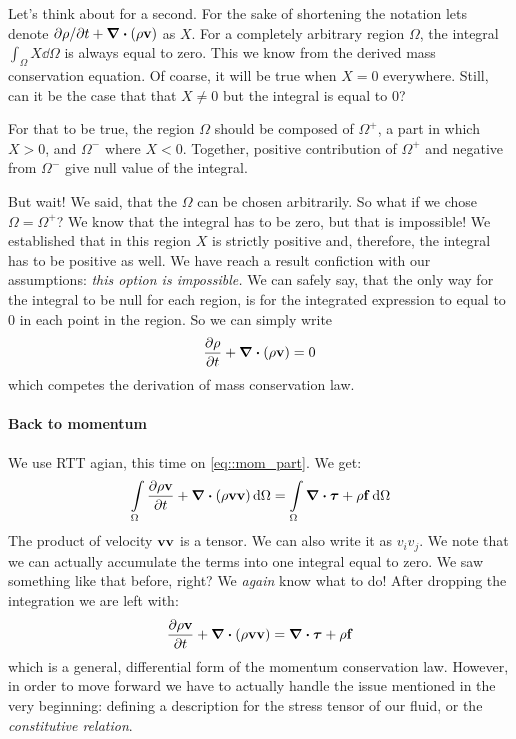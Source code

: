 \documentclass[a4paper]{article}
\begin{document}
Let's think about for a second. For the sake of shortening the notation
lets denote \({\partial\rho}/{\partial t} + \div{(\rho \vb{v})}\) as \(X\). For a
completely arbitrary region \(\Omega\), the integral \(\int_\Omega X \dd{\Omega}\)
is always equal to zero. This we know from the derived mass conservation equation.
Of coarse, it will be true when \(X=0\) everywhere. Still, can it be the case that
that \(X\neq0\) but the integral is equal to 0?

For that to be true, the region \(\Omega\) should be composed of \(\Omega^+\),
a part in which \(X>0\), and \(\Omega^-\) where \(X<0\). Together, positive
contribution of \(\Omega^+\) and negative from \(\Omega^-\) give null value
of the integral.

But wait! We said, that the \(\Omega\) can be chosen arbitrarily. So what
if we chose \(\Omega = \Omega^+\)? We know that the integral has to be zero,
but that is impossible! We established that in this region \(X\) is strictly
positive and, therefore, the integral has to be positive as well. We have
reach a result confiction with our assumptions: \emph{this option is
	impossible.} We can safely say, that the only way for the integral to
be null for each region, is for the integrated expression to equal to 0
in each point in the region. So we can simply write
\[
	\pdv{\rho}{t} + \div{(\rho \vb{v})} = 0
\]
which competes the derivation of mass conservation law.

\paragraph{Back to momentum}
We use RTT agian, this time on \autoref{eq::mom_part}. We get:
\[
	\int\limits_\Omega \pdv{\rho \vb{v}}{t}
	+ \div{\qty(\rho\vb{v}\vb{v} )} \dd{\Omega} =
	\int\limits_\Omega \div\bm{\tau} + \rho\vb{f} \dd{\Omega}
\]
The product of velocity \(\vb{v}\vb{v}\) is a tensor. We can also write
it as \(v_i v_j\). We note that we can actually accumulate the terms into
one integral equal to zero. We saw something like that before, right?
We \emph{again} know what to do! After dropping the integration we are
left with:
\begin{equation}\label{eq::momentum_general_form}
	\pdv{\rho \vb{v}}{t}
	+ \div{\qty(\rho\vb{v}\vb{v} )}  =
	\div\bm{\tau} + \rho\vb{f}
\end{equation}
which is a general, differential form of the momentum conservation law.
However, in order to move forward we have to actually handle the issue
mentioned in the very beginning: defining a description for the stress
tensor of our fluid, or the \emph{constitutive relation}.
\end{document}
